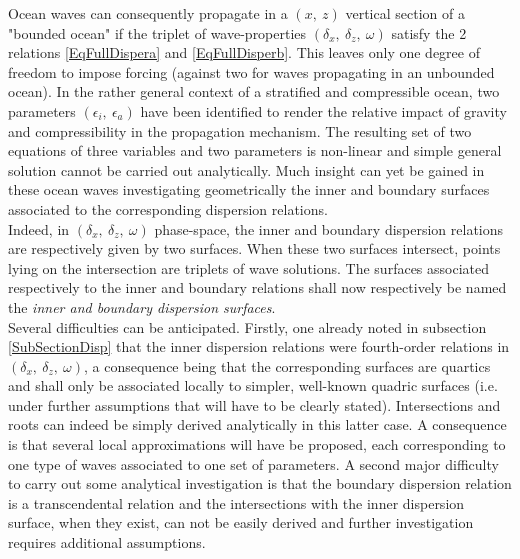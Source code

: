 \documentclass[a4paper,11pt]{article}
\begin{document}
Ocean waves can consequently propagate in a $(x,\ z)$ vertical section of a "bounded ocean" if the triplet of wave-properties $(\delta_x,\ \delta_z,\ \omega)$ satisfy the 2 relations \ref{EqFullDispera} and \ref{EqFullDisperb}. This leaves only one degree of freedom to impose forcing (against two for waves propagating in an unbounded ocean). In the rather general context of a stratified and compressible ocean, two parameters $(\epsilon_i,\ \epsilon_a)$ have been identified to render the relative impact of gravity and compressibility in the propagation mechanism. The resulting set of two equations of three variables and two parameters is non-linear and simple general solution cannot be carried out analytically. Much insight can yet be gained in these ocean waves investigating geometrically the inner and boundary surfaces associated to the corresponding dispersion relations. \\
Indeed, in $(\delta_x,\  \delta_z,\ \omega)$ phase-space, the inner and boundary dispersion relations are respectively given by two surfaces. When these two surfaces intersect, points lying on the intersection are triplets of wave solutions. The surfaces associated respectively to the inner and boundary relations shall now respectively be named the \textit{inner and boundary dispersion surfaces}.\\

Several difficulties can be anticipated. Firstly, one already noted in subsection \ref{SubSectionDisp} that the inner dispersion relations were fourth-order relations in $(\delta_x,\ \delta_z,\ \omega)$, a consequence being that the corresponding surfaces are quartics and shall only be associated locally to simpler, well-known quadric surfaces (i.e. under further assumptions that will have to be clearly stated). Intersections and roots can indeed be simply derived analytically in this latter case. A consequence is that several local approximations will have be proposed, each corresponding to one type of waves associated to one set of parameters. A second major difficulty to carry out some analytical investigation is that the boundary dispersion relation is a transcendental relation and the intersections with the inner dispersion surface, when they exist, can not be easily derived and further investigation  requires additional assumptions.\\ 



\newpage
\end{document}
